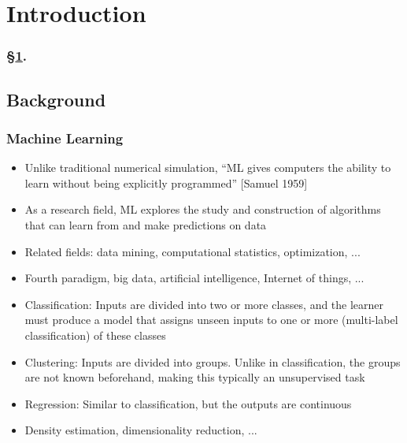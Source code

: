 
\section{Introduction}\label{sec:intro}


\frameinlbffalse

\begin{frame}[plain]
\frametitle{\S\ref{sec:intro}. \insertsection}
\listofframes
\end{frame}
\addtocounter{framenumber}{-1} %

\frameinlbftrue

\subsection{Background}

\begin{frame}
  \MyLogo
  \frametitle{Machine Learning}  
\small
\smallskip

\begin{itemize}

\item Unlike traditional numerical simulation, ``ML gives computers the ability to learn without being explicitly programmed'' {\footnotesize\color{DarkOrchid}[Samuel 1959]}

\item As a research field, ML explores the study and construction of algorithms that can \alert{learn} from and \alert{make predictions} on \alert{data}

\item Related fields: data mining, computational statistics, optimization, ...

\item Fourth paradigm, big data, artificial intelligence, Internet of things, ...

\end{itemize}


\begin{itemize}

\item Classification: Inputs are divided into two or more classes, and the learner must produce a model that assigns unseen inputs to one or more (multi-label classification) of these classes

\item Clustering: Inputs are divided into groups. Unlike in classification, the groups are not known beforehand, making this typically an unsupervised task

\item Regression: Similar to classification, but the outputs are continuous

\item Density estimation, dimensionality reduction, ...

\end{itemize}

\end{frame}

